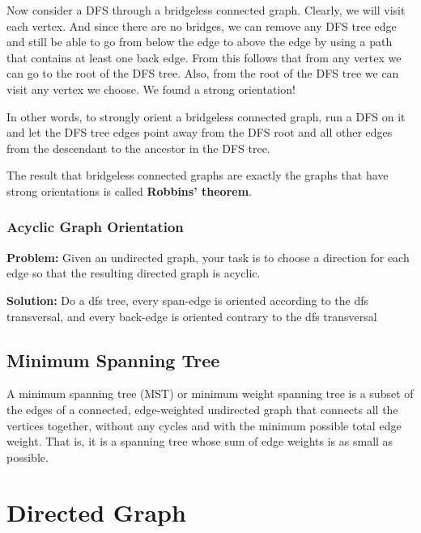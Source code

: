 	Now consider a DFS through a bridgeless connected graph. Clearly, we will visit each vertex.
	And since there are no bridges, we can remove any DFS tree edge and still be able to go from below the edge to
	above the edge by using a path that contains at least one back edge. 
	From this follows that from any vertex we can go to the root of the DFS tree. 
	Also, from the root of the DFS tree we can visit any vertex we choose. We found a strong orientation!

	In other words, to strongly orient a bridgeless connected graph, 
	run a DFS on it and let the DFS tree edges point away from the DFS root and all other edges 
	from the descendant to the ancestor in the DFS tree.


	The result that bridgeless connected graphs are exactly the graphs that have strong orientations is called \textbf{Robbins' theorem}.

		\subsubsection{Acyclic Graph Orientation}

			\textbf{Problem:} Given an undirected graph, your task is to choose a direction for each edge so that the resulting directed graph is acyclic.

			\textbf{Solution:} Do a dfs tree, every span-edge is oriented according to the dfs transversal,
			and every back-edge is oriented contrary to the dfs transversal


	\subsection{Minimum Spanning Tree}

	A minimum spanning tree (MST) or minimum weight spanning tree is a subset of the edges
	of a connected, edge-weighted undirected graph that connects all the vertices together,
	without any cycles and with the minimum possible total edge weight.
	That is, it is a spanning tree whose sum of edge weights is as small as possible.


\section{Directed Graph}

